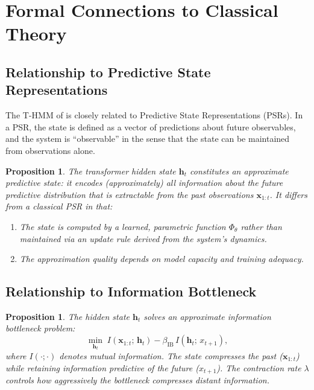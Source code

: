 \documentclass[11pt,a4paper]{article}
\theoremstyle{plain}
\newtheorem{proposition}[theorem]{Proposition}
\theoremstyle{definition}
\theoremstyle{remark}
\begin{document}
\section{Formal Connections to Classical Theory}\label{sec:connections}

\subsection{Relationship to Predictive State Representations}

The T-HMM of  is closely related to Predictive State
Representations (PSRs). In a PSR, the state is defined as a vector of
predictions about future observables, and the system is ``observable'' in the
sense that the state can be maintained from observations alone.

\begin{proposition}
The transformer hidden state $\bm{h}_t$ constitutes an \emph{approximate}
predictive state: it encodes (approximately) all information about the
future predictive distribution that is extractable from the past observations
$\bm{x}_{1:t}$. It differs from a classical PSR in that:
\begin{enumerate}[label=(\alph*),nosep]
  \item The state is computed by a learned, parametric function
        $\Phi_\theta$ rather than maintained via an update rule derived
        from the system's dynamics.
  \item The approximation quality depends on model capacity and training
        adequacy.
\end{enumerate}
\end{proposition}

\subsection{Relationship to Information Bottleneck}

\begin{proposition}
The hidden state $\bm{h}_t$ solves an approximate \emph{information bottleneck}
problem:
\[
  \min_{\bm{h}_t}\; I(\bm{x}_{1:t};\, \bm{h}_t) - \beta_{\mathrm{IB}}\, I(\bm{h}_t;\, x_{t+1}),
\]
where $I(\cdot;\cdot)$ denotes mutual information. The state compresses the
past ($\bm{x}_{1:t}$) while retaining information predictive of the future
($x_{t+1}$). The contraction rate $\lambda$ controls how aggressively the
bottleneck compresses distant information.
\end{proposition}
\end{document}
